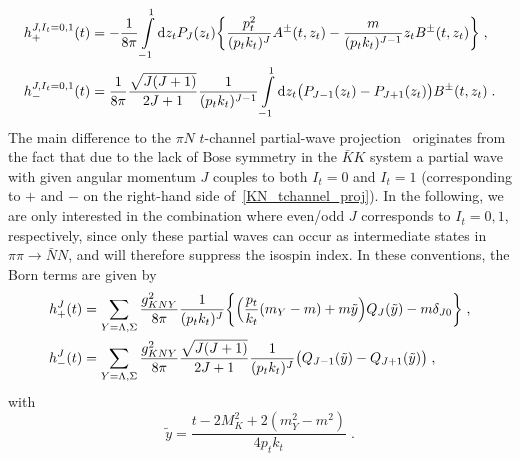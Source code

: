\documentclass[11pt]{article}%
\providecommand{\ec}{\;,}
\providecommand{\ep}{\;.}
\providecommand{\nt}{\notag}
\newcommand{\diff}{\text{d}}
\newcommand{\beq}{\begin{equation}}
\newcommand{\eeq}{\end{equation}}
\begin{document}
\begin{align}
\label{KN_tchannel_proj}
 h_+^{J,I_t=0,1}(t)&=-\frac{1}{8\pi}\int\limits^1_{-1}\diff z_tP_J(z_t)\bigg\{\frac{p_t^2}{(p_tk_t)^J}A^{\pm}(t,z_t)-\frac{m}{(p_tk_t)^{J-1}}z_tB^{\pm}(t,z_t)\bigg\}\ec\nt\\
 h_-^{J,I_t=0,1}(t)&=\frac{1}{8\pi}\frac{\sqrt{J(J+1)}}{2J+1}\frac{1}{(p_tk_t)^{J-1}}\int\limits^1_{-1}\diff z_t\big(P_{J-1}(z_t)-P_{J+1}(z_t)\big)B^{\pm}(t,z_t)\ep
\end{align}
The main difference to the $\pi N$ $t$-channel partial-wave projection~\cite{FrazerFulco:tPW} originates from the fact that due to the lack of Bose symmetry in the $\bar K K$ system a partial wave with given angular momentum $J$ couples to both $I_t=0$ and $I_t=1$ (corresponding to $+$ and $-$ on the right-hand side of~\eqref{KN_tchannel_proj}).
In the following, we are only interested in the combination where even/odd $J$ corresponds to $I_t=0,1$, respectively, since only these partial waves can occur as intermediate states in $\pi\pi\to\bar N N$, and will therefore suppress the isospin index. In these conventions, the Born terms are given by
\begin{align}
\label{hyperon_pole}
 h_+^J(t)&=\sum_{Y={\Lambda,\Sigma}}\frac{g_{KNY}^2}{8\pi}\frac{1}{(p_tk_t)^J}\bigg\{\Big(\frac{p_t}{k_t}(m_Y-m)+m\tilde y\Big)Q_J(\tilde y)-m\delta_{J0}\bigg\}\ec\nt\\
 h_-^J(t)&=\sum_{Y={\Lambda,\Sigma}}\frac{g_{KNY}^2}{8\pi}\frac{\sqrt{J(J+1)}}{2J+1}\frac{1}{(p_tk_t)^J}\big(Q_{J-1}(\tilde y)-Q_{J+1}(\tilde y)\big)\ec
\end{align}
with
\beq
\tilde y=\frac{t-2M_K^2+2(m_Y^2-m^2)}{4p_tk_t}\ep
\eeq
\end{document}
